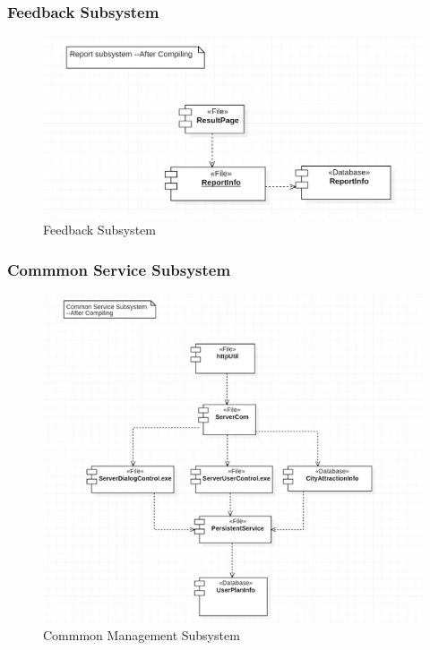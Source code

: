 \documentclass[10pt]{article}
\begin{document}
\subsubsection{Feedback Subsystem}
\begin{figure}[H]
    \centering
    
    \includegraphics[width=14cm]{reportafter.png}
    \caption{Feedback Subsystem}
    \label{Feedback Subsystem 2}
\end{figure}

\subsubsection{Commmon Service Subsystem}
\begin{figure}[H]
    \centering
    
    \includegraphics[width=14cm]{commonafter.png}
    \caption{Commmon Management Subsystem}
    \label{Commmon Management Subsystem 2}
\end{figure}
\end{document}
